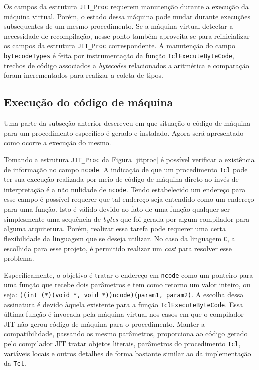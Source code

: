 Os campos da estrutura \verb!JIT_Proc! requerem
manutenção durante a execução da máquina virtual. Porém, o estado dessa
máquina pode mudar durante execuções subsequentes de um mesmo
procedimento. Se a máquina virtual detectar a necessidade de
recompilação, nesse ponto também aproveita-se para reinicializar os
campos da estrutura \verb!JIT_Proc!
correspondente. A manutenção do campo \verb!bytecodeTypes! é feita por
instrumentação da função \verb!TclExecuteByteCode!,
trechos de código associados a \textit{bytecodes}
relacionados a aritmética e comparação foram incrementados para
realizar a coleta de tipos.


\subsection{Execução do código de máquina}
\label{codeexec}
Uma parte da subseção anterior descreveu em que situação o código de
máquina para um procedimento específico é gerado e instalado. Agora será
apresentado como ocorre a execução do mesmo.

Tomando a estrutura \verb!JIT_Proc! da Figura \ref{jitproc}
é possível verificar a existência de informação no campo \verb!ncode!.
A indicação de que um
procedimento \texttt{Tcl} pode ter sua execução realizada por meio de
código de máquina direto ao invés de interpretação é a não nulidade de
\verb!ncode!. Tendo estabelecido um endereço para esse campo é %
possível requerer que tal endereço seja entendido como um endereço para
uma função. %
Isto é válido devido ao fato de uma função qualquer ser
simplesmente uma sequência de \textit{bytes} que foi gerada por algum
compilador para alguma arquitetura. Porém, realizar essa tarefa %
pode
requerer uma certa flexibilidade da linguagem que se deseja
utilizar. No caso da linguagem \texttt{C}, a escolhida para
esse projeto, é permitido realizar um \textit{cast} para %
resolver esse problema.

Especificamente, o objetivo é tratar o endereço em
\verb!ncode! como um ponteiro para uma função que recebe dois
parâmetros e tem como retorno um valor inteiro, %
ou seja:
\verb!((int (*)(void *, void *))ncode)(param1, param2)!. A escolha
dessa assinatura é devido àquela existente para a função
\verb!TclExecuteByteCode!. Essa última função é invocada
pela máquina virtual nos casos em que o compilador
JIT não gerou código de máquina para o procedimento. Manter a
compatibilidade, passando os mesmo
parâmetros, proporciona ao código gerado pelo compilador JIT tratar
objetos literais, parâmetros do procedimento \texttt{Tcl}, variáveis
locais e outros detalhes de forma bastante similar ao da
implementação da \texttt{Tcl}.



